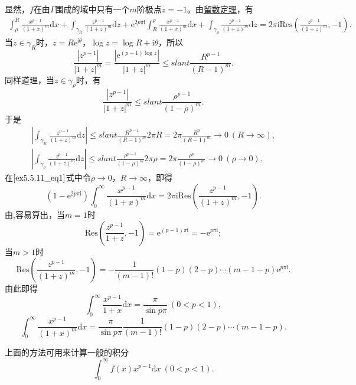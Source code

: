 \documentclass[../../main.tex]{subfiles}
\begin{document}
\begin{solution}
显然，\( f \)在由\( \Gamma \)围成的域中只有一个\( m \)阶极点\( z = -1 \)。由\hyperref[theorem:留数定理(残数定理)-定理5.4.9]{留数定理}，有
\begin{align}
\int_{\rho}^{R} \frac{x^{p - 1}}{(1 + x)^m} \mathrm{d}x + \int_{\gamma_R} \frac{z^{p - 1}}{(1 + z)^m} \mathrm{d}z + \mathrm{e}^{2p\pi \mathrm{i}} \int_{R}^{\rho} \frac{x^{p - 1}}{(1 + x)^m} \mathrm{d}x
+ \int_{\gamma_{\rho}} \frac{z^{p - 1}}{(1 + z)^m} \mathrm{d}z = 2\pi \mathrm{i} \mathrm{Res}\left( \frac{z^{p - 1}}{(1 + z)^m}, -1 \right). \label{ex5.5.11_eq1}
\end{align}
当\( z \in \gamma_R \)时，\( z = R\mathrm{e}^{\mathrm{i}\theta} \)，\( \log z = \log R + \mathrm{i}\theta \)，所以
\[
\frac{|z^{p - 1}|}{|1 + z|^m} = \frac{|\mathrm{e}^{(p - 1)\log z}|}{|1 + z|^m} \leqslant slant \frac{R^{p - 1}}{(R - 1)^m}.
\]
同样道理，当\( z \in \gamma_{\rho} \)时，有
\[
\frac{|z^{p - 1}|}{|1 + z|^m} \leqslant slant \frac{\rho^{p - 1}}{(1 - \rho)^m}.
\]
于是
\begin{gather*}
\left| \int_{\gamma_R} \frac{z^{p - 1}}{(1 + z)^m} \mathrm{d}z \right| \leqslant slant \frac{R^{p - 1}}{(R - 1)^m} 2\pi R
= 2\pi \frac{R^p}{(R - 1)^m}
\to 0 \ (R \to \infty),
\\
\left| \int_{\gamma_{\rho}} \frac{z^{p - 1}}{(1 + z)^m} \mathrm{d}z \right| \leqslant slant \frac{\rho^{p - 1}}{(1 - \rho)^m} 2\pi \rho
= 2\pi \frac{\rho^p}{(1 - \rho)^m}
\to 0 \ (\rho \to 0).
\end{gather*}
在\(\eqref{ex5.5.11_eq1}\)式中令\( \rho \to 0 \)，\( R \to \infty \)，即得
\[
(1 - \mathrm{e}^{2p\pi \mathrm{i}}) \int_{0}^{\infty} \frac{x^{p - 1}}{(1 + x)^m} \mathrm{d}x = 2\pi \mathrm{i} \mathrm{Res}\left( \frac{z^{p - 1}}{(1 + z)^m}, -1 \right).
\]
由,容易算出，当\( m = 1 \)时
\[
\mathrm{Res}\left( \frac{z^{p - 1}}{1 + z}, -1 \right) = \mathrm{e}^{(p - 1)\pi \mathrm{i}} = -\mathrm{e}^{p\pi \mathrm{i}};
\]
当\( m > 1 \)时
\[
\mathrm{Res}\left( \frac{z^{p - 1}}{(1 + z)^m}, -1 \right) = -\frac{1}{(m - 1)!}(1 - p)(2 - p)
\cdots (m - 1 - p) \mathrm{e}^{p\pi \mathrm{i}}.
\]
由此即得
\[
\int_{0}^{\infty} \frac{x^{p - 1}}{1 + x} \mathrm{d}x = \frac{\pi}{\sin p\pi} \ (0 < p < 1),
\]
\[
\int_{0}^{\infty} \frac{x^{p - 1}}{(1 + x)^m} \mathrm{d}x = \frac{\pi}{\sin p\pi} \frac{1}{(m - 1)!}(1 - p)(2 - p)
\cdots (m - 1 - p).
\]
\end{solution}
\begin{remark}
上面的方法可用来计算一般的积分
\[
\int_{0}^{\infty} f(x) x^{p - 1} \mathrm{d}x \ (0 < p < 1).
\]
\end{remark}
\end{document}
